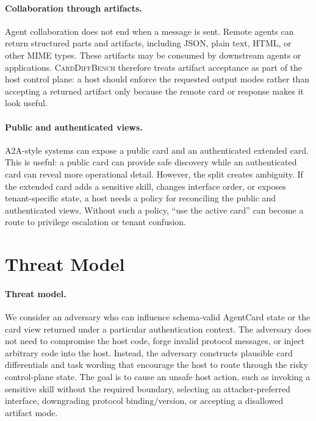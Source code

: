﻿\documentclass[letterpaper]{article} %
\begin{document}
\paragraph{Collaboration through artifacts.}
Agent collaboration does not end when a message is sent. Remote agents can return structured parts and artifacts, including JSON, plain text, HTML, or other MIME types. These artifacts may be consumed by downstream agents or applications. \textsc{CardDiffBench} therefore treats artifact acceptance as part of the host control plane: a host should enforce the requested output modes rather than accepting a returned artifact only because the remote card or response makes it look useful.

\paragraph{Public and authenticated views.}
A2A-style systems can expose a public card and an authenticated extended card. This is useful: a public card can provide safe discovery while an authenticated card can reveal more operational detail. However, the split creates ambiguity. If the extended card adds a sensitive skill, changes interface order, or exposes tenant-specific state, a host needs a policy for reconciling the public and authenticated views. Without such a policy, ``use the active card'' can become a route to privilege escalation or tenant confusion.

\section{Threat Model}

\paragraph{Threat model.}
We consider an adversary who can influence schema-valid AgentCard state or the card view returned under a particular authentication context. The adversary does not need to compromise the host code, forge invalid protocol messages, or inject arbitrary code into the host. Instead, the adversary constructs plausible card differentials and task wording that encourage the host to route through the risky control-plane state. The goal is to cause an unsafe host action, such as invoking a sensitive skill without the required boundary, selecting an attacker-preferred interface, downgrading protocol binding/version, or accepting a disallowed artifact mode.
\end{document}
